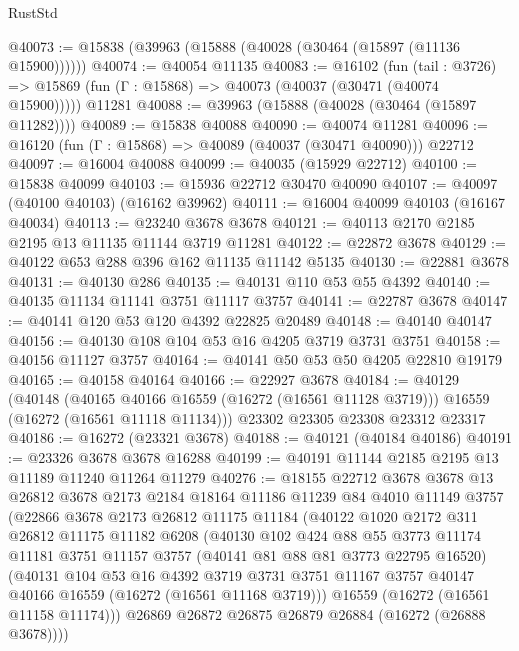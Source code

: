 \begin{lexlean}{RustStd}
\begin{coremodule}
@40073 := @15838 (@39963 (@15888 (@40028 (@30464 (@15897 (@11136 @15900))))))
@40074 := @40054 @11135
@40083 := @16102
    (fun (tail : @3726) => @15869 (fun (Γ : @15868) => @40073 (@40037 (@30471 (@40074 @15900)))))
    @11281
@40088 := @39963 (@15888 (@40028 (@30464 (@15897 @11282))))
@40089 := @15838 @40088
@40090 := @40074 @11281
@40096 := @16120 (fun (Γ : @15868) => @40089 (@40037 (@30471 @40090))) @22712
@40097 := @16004 @40088
@40099 := @40035 (@15929 @22712)
@40100 := @15838 @40099
@40103 := @15936 @22712 @30470 @40090
@40107 := @40097 (@40100 @40103) (@16162 @39962)
@40111 := @16004 @40099 @40103 (@16167 @40034)
@40113 := @23240 @3678 @3678
@40121 := @40113 @2170 @2185 @2195 @13 @11135 @11144 @3719 @11281
@40122 := @22872 @3678
@40129 := @40122 @653 @288 @396 @162 @11135 @11142 @5135
@40130 := @22881 @3678
@40131 := @40130 @286
@40135 := @40131 @110 @53 @55 @4392
@40140 := @40135 @11134 @11141 @3751 @11117 @3757
@40141 := @22787 @3678
@40147 := @40141 @120 @53 @120 @4392 @22825 @20489
@40148 := @40140 @40147
@40156 := @40130 @108 @104 @53 @16 @4205 @3719 @3731 @3751
@40158 := @40156 @11127 @3757
@40164 := @40141 @50 @53 @50 @4205 @22810 @19179
@40165 := @40158 @40164
@40166 := @22927 @3678
@40184 := @40129
    (@40148
      (@40165 @40166 @16559 (@16272 (@16561 @11128 @3719)))
      @16559
      (@16272 (@16561 @11118 @11134)))
    @23302
    @23305
    @23308
    @23312
    @23317
@40186 := @16272 (@23321 @3678)
@40188 := @40121 (@40184 @40186)
@40191 := @23326 @3678 @3678 @16288
@40199 := @40191 @11144 @2185 @2195 @13 @11189 @11240 @11264 @11279
@40276 := @18155
    @22712
    @3678
    @3678
    @13
    @26812
    @3678
    @2173
    @2184
    @18164
    @11186
    @11239
    @84
    @4010
    @11149
    @3757
    (@22866
      @3678
      @2173
      @26812
      @11175
      @11184
      (@40122
        @1020
        @2172
        @311
        @26812
        @11175
        @11182
        @6208
        (@40130
          @102
          @424
          @88
          @55
          @3773
          @11174
          @11181
          @3751
          @11157
          @3757
          (@40141 @81 @88 @81 @3773 @22795 @16520)
          (@40131
            @104
            @53
            @16
            @4392
            @3719
            @3731
            @3751
            @11167
            @3757
            @40147
            @40166
            @16559
            (@16272 (@16561 @11168 @3719)))
          @16559
          (@16272 (@16561 @11158 @11174)))
        @26869
        @26872
        @26875
        @26879
        @26884
        (@16272 (@26888 @3678))))

\end{coremodule}
\end{lexlean}
